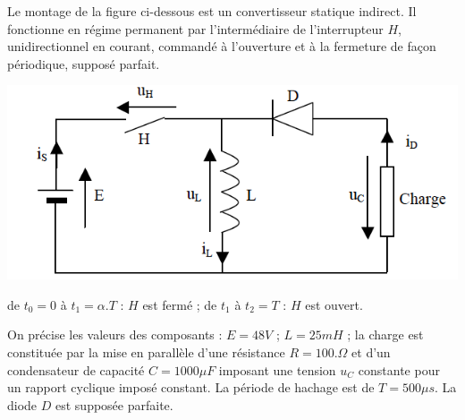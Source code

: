 \correction{ %
\begin{enumerate}
\item $H$ fermé. d'où $U_D=-E_c$. Donc \fbox{$D$ bloquante}
\item \(i_s(t)=\frac{1}{L}\int U_L dt\). Comme $H$ fermé, $U_L=E$.\\
On a alors \fbox{\(i_s(t)=I_{min} + \frac{E}{L}t=12+1920t \)}
\item \fbox{\( U_H=E_c\) pour $t\in [t_1,t_2[$, sinon nulle}\\
Pour $t\in [0,t_1[$, \(i_s(t)=I_{min} + \frac{E}{L}t\) (question précédente)
Pour $t\in [t_1,t_2[$, $U_L=E-E_c<0$ d'où \fbox{\(i_s(t)=I_{max} + \frac{E-E_c}{L}t\)}
\item $U_H=(1-\alpha)E_c$ (visible graphiquement). Comme $u_H(t)+L\frac{di_s}{dt}=E$, $U_H=E$.\\
Ainsi \fbox{\(E_c=\frac{E}{1-\alpha}=144V \)}
\item Comme \( \Delta i_s=I_{max}-I_{min} \), \fbox{\(\Delta i_s=\frac{E \alpha T}{L} \)}
\end{enumerate}
}
\newpage


Le montage de la figure ci-dessous est un convertisseur statique indirect. Il fonctionne en régime permanent par l’intermédiaire de l’interrupteur $H$, unidirectionnel en courant, commandé à l’ouverture et à la fermeture de façon périodique, supposé parfait. 
\begin{center}
\includegraphics[scale=0.5]{png/hacheur3.png}
\end{center}

de $t_0=0$ à $t_1=\alpha.T$ : $H$ est fermé ;
de $t_1$ à $t_2=T$ : $H$ est ouvert.

On précise les valeurs des composants : $E=48V$ ; $L=25mH$ ; la charge est constituée par la mise en parallèle d’une résistance $R=100.\Omega$ et d’un condensateur de capacité $C=1000 \mu F$ imposant une tension $u_C$ constante pour un rapport cyclique imposé constant. La période de hachage est de $T=500 \mu s$. La diode $D$ est supposée parfaite.


